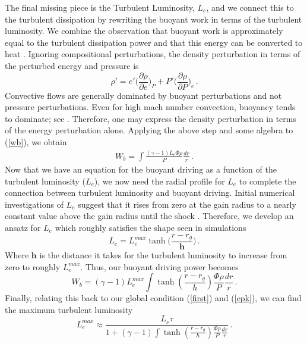\documentclass[twocolumn]{aastex6}
\begin{document}
The final missing piece is the Turbulent Luminosity, $L_e$, and we
connect this to the turbulent dissipation by rewriting the buoyant
work in terms of the turbulent luminosity. We combine the observation that
buoyant work is approximately equal to the turbulent dissipation power
\citep{murphy13} and that this energy can be converted to heat
\citep{murphy11}.  
Ignoring compositional perturbations, the density perturbation in terms of
the perturbed energy and pressure is 
\begin{equation}
  \rho ' = e'\big(\frac{\partial \rho}{\partial e}\big)_P + P'\big(\frac{\partial \rho}{\partial P}\big)_e \, .
\end{equation}
Convective flows are generally dominated by buoyant
  perturbations and not pressure perturbations.  Even for high mach
  number convection, buoyancy tends to dominate; see
\citet{murphy13}.  Therefore, one may
express the density perturbation in terms of the energy perturbation alone. Applying the above step and some algebra to (\ref{wb}), we obtain
\begin{equation}
\begin{aligned}
W_b = \int \frac{ (\gamma - 1)L_e \Phi \rho }{P} \frac{dr}{r} \, .
\end{aligned}
\end{equation}
Now that we have an equation for the buoyant driving as a function of
the turbulent luminosity ($L_e$), we now need the radial profile for $L_e$
  to complete the connection between turbulent luminosity and buoyant
  driving.  Initial numerical investigations of $L_e$ suggest that it
  rises from zero at the gain radius to a nearly constant value above
  the gain radius until the shock \citep{murphy13}.  Therefore, we develop an ansatz for
$L_e$ which roughly satisfies the shape seen in simulations
\begin{equation}
L_e = L_e^{max} \tanh\bigg(\frac{r-r_g}{\textbf{h}}\bigg) \, .
\label{le}
\end{equation}
Where $\textbf{h}$ is the distance it takes for the turbulent
  luminosity to increase from zero to roughly $L_e^{max}$. Thus, our buoyant driving power becomes
\begin{equation}
W_b  = (\gamma - 1)L_e^{max} \int \tanh \left ( \frac{r -
  r_g}{h} \right ) \frac{\Phi \rho}{ P } \frac{dr}{r} \, .
\end{equation}
 Finally, relating this back to our global condition (\ref{first}) and (\ref{epk}), we can find the maximum turbulent luminosity
\begin{equation}
L_e^{max} \approx \frac{L_\nu \tau}{1 + (\gamma - 1) \int
  \tanh \left ( \frac{r - r_g}{h} \right ) \frac{\Phi \rho}{ P } \frac{dr}{r}}
\, .
\label{lemax}  
\end{equation}
\end{document}
